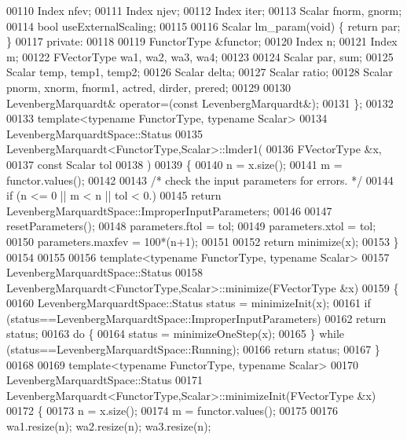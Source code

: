 \begin{DoxyCode}
00110     Index nfev;
00111     Index njev;
00112     Index iter;
00113     Scalar fnorm, gnorm;
00114     \textcolor{keywordtype}{bool} useExternalScaling; 
00115 
00116     Scalar lm\_param(\textcolor{keywordtype}{void}) \{ \textcolor{keywordflow}{return} par; \}
00117 \textcolor{keyword}{private}:
00118     
00119     FunctorType &functor;
00120     Index n;
00121     Index m;
00122     FVectorType wa1, wa2, wa3, wa4;
00123 
00124     Scalar par, sum;
00125     Scalar temp, temp1, temp2;
00126     Scalar delta;
00127     Scalar ratio;
00128     Scalar pnorm, xnorm, fnorm1, actred, dirder, prered;
00129 
00130     LevenbergMarquardt& operator=(\textcolor{keyword}{const} LevenbergMarquardt&);
00131 \};
00132 
00133 \textcolor{keyword}{template}<\textcolor{keyword}{typename} FunctorType, \textcolor{keyword}{typename} Scalar>
00134 LevenbergMarquardtSpace::Status
00135 LevenbergMarquardt<FunctorType,Scalar>::lmder1(
00136         FVectorType  &x,
00137         \textcolor{keyword}{const} Scalar tol
00138         )
00139 \{
00140     n = x.size();
00141     m = functor.values();
00142 
00143     \textcolor{comment}{/* check the input parameters for errors. */}
00144     \textcolor{keywordflow}{if} (n <= 0 || m < n || tol < 0.)
00145         \textcolor{keywordflow}{return} LevenbergMarquardtSpace::ImproperInputParameters;
00146 
00147     resetParameters();
00148     parameters.ftol = tol;
00149     parameters.xtol = tol;
00150     parameters.maxfev = 100*(n+1);
00151 
00152     \textcolor{keywordflow}{return} minimize(x);
00153 \}
00154 
00155 
00156 \textcolor{keyword}{template}<\textcolor{keyword}{typename} FunctorType, \textcolor{keyword}{typename} Scalar>
00157 LevenbergMarquardtSpace::Status
00158 LevenbergMarquardt<FunctorType,Scalar>::minimize(FVectorType  &x)
00159 \{
00160     LevenbergMarquardtSpace::Status status = minimizeInit(x);
00161     \textcolor{keywordflow}{if} (status==LevenbergMarquardtSpace::ImproperInputParameters)
00162         \textcolor{keywordflow}{return} status;
00163     \textcolor{keywordflow}{do} \{
00164         status = minimizeOneStep(x);
00165     \} \textcolor{keywordflow}{while} (status==LevenbergMarquardtSpace::Running);
00166     \textcolor{keywordflow}{return} status;
00167 \}
00168 
00169 \textcolor{keyword}{template}<\textcolor{keyword}{typename} FunctorType, \textcolor{keyword}{typename} Scalar>
00170 LevenbergMarquardtSpace::Status
00171 LevenbergMarquardt<FunctorType,Scalar>::minimizeInit(FVectorType  &x)
00172 \{
00173     n = x.size();
00174     m = functor.values();
00175 
00176     wa1.resize(n); wa2.resize(n); wa3.resize(n);

\end{DoxyCode}
